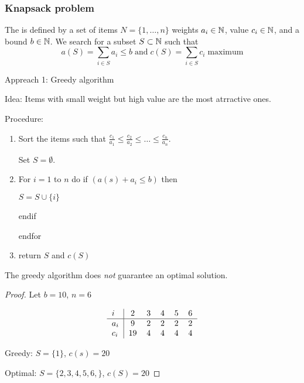 \begin{lec}[2011-10-26]\end{lec}

\setcounter{section}{6}
\setcounter{subsection}{0}

\subsubsection*{Knapsack problem} 

\begin{defn} %
	The  is defined by a set of items $N = \{ 1, … , n \}$ weights $a_i \in \mathbb{N}$, value $c_i \in \mathbb{N}$, and a bound $b\in \mathbb{N}$. We search for a subset $S\subset \mathbb{N}$ such that 
	\[
		a(S) = \sum_{i \in S} a_i \leq b \; \text{and} \; c(S) = \sum_{i\in S} c_i \; \text{maximum}
	\]
\end{defn}

Appreach 1: Greedy algorithm

Idea: Items with small weight but high value are the most atrractive ones.

Procedure:
\begin{enumerate}
	\item Sort the items such that $\frac{c_1}{a_1} \leq \frac{c_2}{a_2} \leq … \leq \frac{c_n}{a_n}$.
	
	Set $S = \emptyset$.
	\item For $i = 1$ to $n$ do
		if $( a(s) + a_i \leq b) $ then
		
			$S = S \cup \{ i \}$
			
		endif
	
	endfor
	\item return $S$ and $c(S)$
\end{enumerate}

\begin{thm}
	The greedy algorithm does \emph{ not } guarantee an optimal solution.
\end{thm}

\begin{proof}
	Let $b=10$, $n = 6$
	
	\begin{align*}
		\begin{tabular}{l|ccccc}
			$i$ & 2 & 3 & 4 & 5 & 6 \\ \hline
			$a_i$ & 9 & 2 & 2 & 2 & 2 \\
			$c_i$ &19 & 4 & 4 & 4 & 4
		\end{tabular}
	\end{align*}
	
	Greedy: $S=\{1\}$, $c(s)=20$
	
	Optimal: $S=\{2,3,4,5,6,\}$, $c(S)=20$
\end{proof}

